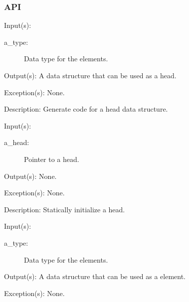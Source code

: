 \subsubsection{API}
\begin{capi}
\label{ql_head}
	\begin{capilist}
	\item[Input(s): ]
		\begin{description}\item[]
		\item[a\_type: ]
			Data type for the  elements.
		\end{description}
	\item[Output(s): ]
		A data structure that can be used as a  head.
	\item[Exception(s): ] None.
	\item[Description: ]
		Generate code for a  head data structure.
	\end{capilist}
\label{ql_head_initializer}
	\begin{capilist}
	\item[Input(s): ]
		\begin{description}\item[]
		\item[a\_head: ]
			Pointer to a \classname{ql} head.
		\end{description}
	\item[Output(s): ] None.
	\item[Exception(s): ] None.
	\item[Description: ]
		Statically initialize a  head.
	\end{capilist}
\label{ql_elm}
	\begin{capilist}
	\item[Input(s): ]
		\begin{description}\item[]
		\item[a\_type: ]
			Data type for the  elements.
		\end{description}
	\item[Output(s): ]
		A data structure that can be used as a  element.
	\item[Exception(s): ] None.

\end{capilist}
\end{capi}
